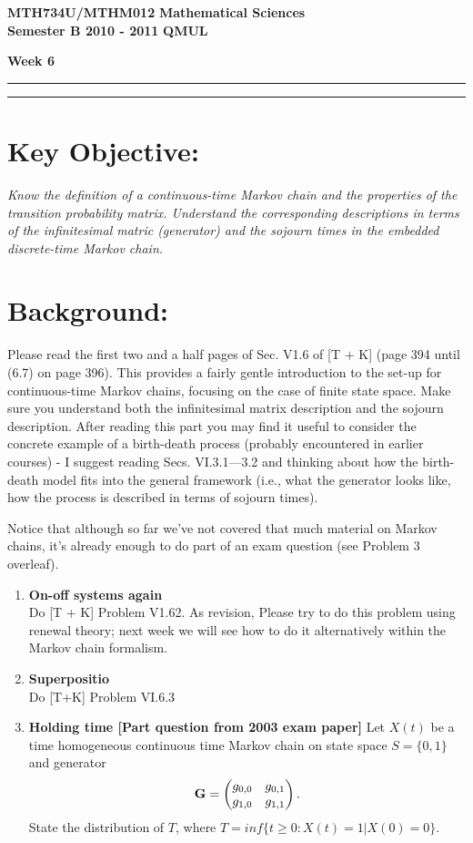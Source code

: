 \documentclass[11pt,a4paper]{article}
\begin{document}
  \textbf{MTH734U/MTHM012} \hfill \textbf{Mathematical Sciences}\\
  \textbf{Semester B 2010 - 2011} \hfill \textbf{QMUL}
  \begin{center}
    \textbf{\huge Week 6}
  \end{center}
  \hrule \vspace{2mm} \hrule

  \section*{Key Objective:}
  \textit{Know the definition of a continuous-time Markov chain and the properties of the transition probability matrix. Understand the corresponding descriptions in terms of the infinitesimal matric (generator) and the sojourn times in the embedded discrete-time Markov chain.}

  \section*{Background:}
  Please read the first two and a half pages of Sec. V1.6 of [T + K] (page 394 until (6.7) on page 396). This provides a fairly gentle introduction to the set-up for continuous-time Markov chains, focusing on the case of finite state space. Make sure you understand both the infinitesimal matrix description and the sojourn description. After reading this part you may find it useful to consider the concrete example of a birth-death process (probably encountered in earlier courses) - I suggest reading Secs. VI.3.1—3.2 and thinking about how the birth-death model fits into the general framework (i.e., what the generator looks like, how the process is described in terms of sojourn times).\par
  Notice that although so far we've not covered that much material on Markov chains, it's already enough to do part of an exam question (see Problem 3 overleaf).

  \newpage
  \begin{enumerate}
    \item \textbf{On-off systems again}\\
    Do [T + K] Problem V1.62. As revision, Please try to do this problem using renewal theory; next week we will see how to do it alternatively within the Markov chain formalism.
    \item \textbf{Superpositio}\\
    Do [T+K] Problem VI.6.3
    \item \textbf{Holding time [Part question from 2003 exam paper]}
    Let $X(t)$ be a time homogeneous continuous time Markov chain on state space $S = \{0, 1\}$ and generator
    $$
    \vb{G} =
    \begin{pmatrix}
      g_{0, 0} & g_{0, 1}\\
      g_{1, 0} & g_{1, 1}
    \end{pmatrix}.
    $$
    State the distribution of $T$, where $T = inf\{t \geq 0 : X(t) = 1|X(0) = 0\}$.
  \end{enumerate}
\end{document}
